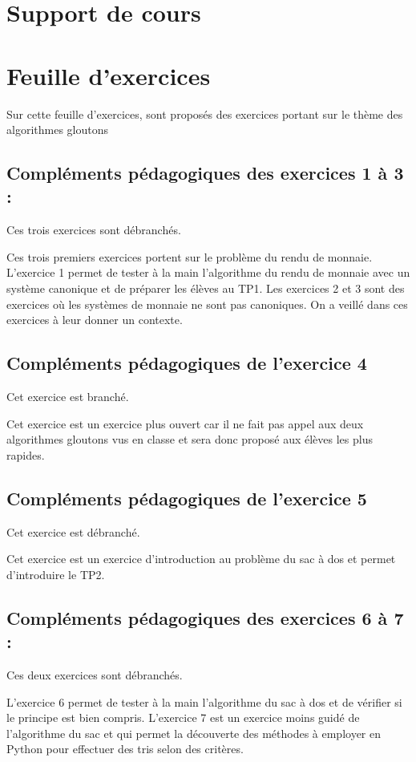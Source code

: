 \documentclass[12pt,french]{report}
\begin{document}
\chapter{Support de cours}

\chapter{Feuille d'exercices}
Sur cette feuille d'exercices, sont proposés des exercices portant sur le thème des algorithmes gloutons
\section{Compléments pédagogiques des exercices 1 à 3 :}
\begin{center} Ces trois exercices sont débranchés. \end{center}
Ces trois premiers exercices portent sur le problème du rendu de monnaie.\\
L'exercice 1 permet de tester à la main l'algorithme du rendu de monnaie avec un système canonique et de préparer les élèves au TP1.
Les exercices 2 et 3 sont des exercices où les systèmes de monnaie ne sont pas canoniques. On a veillé dans ces exercices à leur donner un contexte.
\section{Compléments pédagogiques de l'exercice 4}
\begin{center} Cet exercice est branché. \end{center}
Cet exercice est un exercice plus ouvert car il ne fait pas appel aux deux algorithmes gloutons vus en classe et sera donc proposé aux élèves les plus rapides.
\section{Compléments pédagogiques de l'exercice 5}
\begin{center} Cet exercice est débranché. \end{center}
Cet exercice est un exercice d'introduction au problème du sac à dos et permet d'introduire le TP2.
\section{Compléments pédagogiques des exercices 6 à 7 :}
\begin{center} Ces deux exercices sont débranchés. \end{center}
L'exercice 6 permet de tester à la main l'algorithme du sac à dos et de vérifier si le principe est bien compris.
L'exercice 7 est un exercice moins guidé de l'algorithme du sac et qui permet la découverte des méthodes à employer en Python pour effectuer des tris selon des critères.
\end{document}
